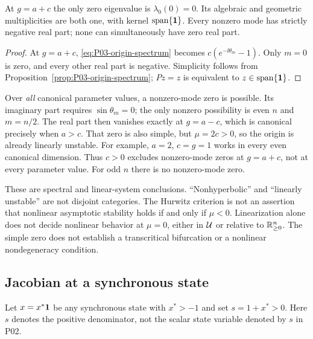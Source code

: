 \begin{proposition}
\label{prop:P03-boundary}
At $g=a+c$ the only zero eigenvalue is $\lambda_0(0)=0$.
Its algebraic and geometric multiplicities are both one, with
kernel $\operatorname{span}\{\mathbf{1}\}$. Every nonzero mode has
strictly negative real part; none can simultaneously have zero real part.
\end{proposition}
\begin{proof}
At $g=a+c$, \eqref{eq:P03-origin-spectrum} becomes
$c(e^{-\ii\theta_m}-1)$. Only $m=0$ is zero, and every other real
part is negative. Simplicity follows from Proposition~\ref{prop:P03-origin-spectrum};
$Pz=z$ is equivalent to $z\in\operatorname{span}\{\mathbf{1}\}$.
\end{proof}

\begin{remark}
\label{rem:P03-other-zero}
Over \emph{all} canonical parameter values, a nonzero-mode zero
is possible. Its imaginary part requires $\sin\theta_m=0$;
the only nonzero possibility is even $n$ and $m=n/2$.
The real part then vanishes exactly at $g=a-c$, which is
canonical precisely when $a>c$. That zero is also simple, but
$\mu=2c>0$, so the origin is already linearly unstable. For example,
$a=2$, $c=g=1$ works in every even canonical dimension.
Thus $c>0$ excludes nonzero-mode zeros at $g=a+c$, not at every
parameter value. For odd $n$ there is no nonzero-mode zero.
\end{remark}

These are spectral and linear-system conclusions. ``Nonhyperbolic''
and ``linearly unstable'' are not disjoint categories. The Hurwitz
criterion is not an assertion that nonlinear asymptotic stability
holds if and only if $\mu<0$. Linearization alone does not decide
nonlinear behavior at $\mu=0$, either in $\mathcal{U}$ or relative to
$\mathbb{R}_{\geq 0}^{n}$. The simple zero does not establish a transcritical
bifurcation or a nonlinear nondegeneracy condition.

\subsection{Jacobian at a synchronous state}
\label{slot:P03-3}
Let $x=x^*\mathbf{1}$ be any synchronous state with $x^*>-1$ and set
$s=1+x^*>0$. Here $s$ denotes the positive denominator, not the
scalar state variable denoted by $s$ in P02.

